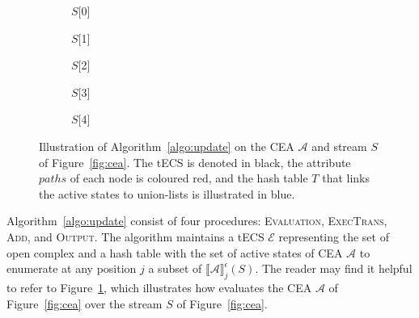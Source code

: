 \begin{figure}[t]
  \centering
  \begin{subfigure}[b]{0.1\linewidth}
    \caption*{$S[$0$]$}
  \end{subfigure}
  \begin{subfigure}[b]{0.1\linewidth}
    \caption*{$S[$1$]$}
  \end{subfigure}
  \begin{subfigure}[b]{0.24\linewidth}
    \caption*{$S[$2$]$}
  \end{subfigure}
  \begin{subfigure}[b]{0.24\linewidth}
    \caption*{$S[$3$]$}
  \end{subfigure}
  \begin{subfigure}[b]{0.28\linewidth}
    \caption*{$S[$4$]$}
  \end{subfigure}
  \caption{Illustration of Algorithm~\ref{algo:update} on the CEA $\mathcal{A}$ and stream $S$ of Figure~\ref{fig:cea}. The tECS is denoted in black, the attribute $paths$ of each node is coloured red, and the hash table $T$ that links the active states to union-lists is illustrated in blue.}
  \label{fig:tecs:update}
\end{figure}

Algorithm~\ref{algo:update} consist of four procedures: \textsc{Evaluation}, \textsc{ExecTrans}, \textsc{Add}, and \textsc{Output}. The algorithm maintains a tECS $\mathcal{E}$ representing the set of open complex and a hash table with the set of active states of CEA $\mathcal{A}$ to enumerate at any position $j$ a subset of ${\llbracket \mathcal{A} \rrbracket}^{\epsilon}_{j}(S)$. The reader may find it helpful to refer to Figure~\ref{fig:tecs:update}, which illustrates how  evaluates the CEA $\mathcal{A}$ of Figure~\ref{fig:cea} over the stream $S$ of Figure~\ref{fig:cea}.

